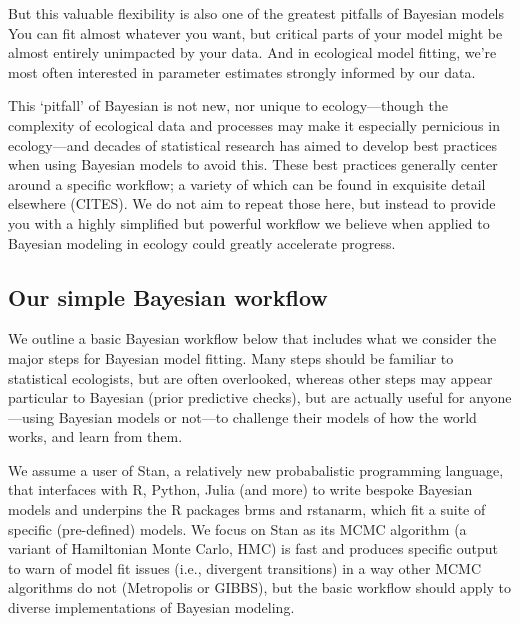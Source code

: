 \documentclass[11pt]{article}
\begin{document}
But this valuable flexibility is also one of the greatest pitfalls of Bayesian models You can fit almost whatever you want, but critical parts of your model might be almost entirely unimpacted by your data. And in ecological model fitting, we're most often interested in parameter estimates strongly informed by our data. 

This `pitfall' of Bayesian is not new, nor unique to ecology---though the complexity of ecological data and processes may make it especially pernicious in ecology---and decades of statistical research has aimed to develop best practices when using Bayesian models to avoid this. These best practices generally center around a specific workflow; a variety of which can be found in exquisite detail elsewhere (CITES). We do not aim to repeat those here, but instead to provide you with a highly simplified but powerful workflow we believe when applied to Bayesian modeling in ecology could greatly accelerate progress. %

\subsection{Our simple Bayesian workflow}

We outline a basic Bayesian workflow below that includes what we consider the major steps for Bayesian model fitting. Many steps should be familiar to statistical ecologists, but are often overlooked, whereas other steps may appear particular to Bayesian (\eg prior predictive checks), but are actually useful for anyone---using Bayesian models or not---to challenge their models of how the world works, and learn from them. 

We assume a user of \textsf{Stan}, a relatively new probabalistic programming language, that interfaces with \textsf{R, Python, Julia} (and more) to write bespoke Bayesian models and underpins the \textsf{R} packages \textsf{brms} and \textsf{rstanarm}, which fit a suite of specific (pre-defined) models. We focus on \textsf{Stan} as its MCMC algorithm (a variant of Hamiltonian Monte Carlo, HMC) is fast and produces specific output to warn of model fit issues (i.e., divergent transitions) in a way other MCMC algorithms do not (\eg Metropolis or GIBBS), but the basic workflow should apply to diverse implementations of Bayesian modeling. \\
\end{document}
